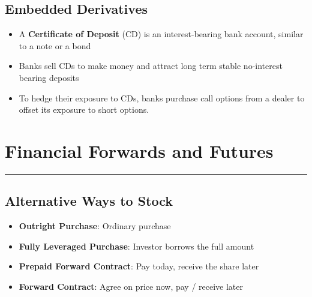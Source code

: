 \documentclass[11pt]{article}
\begin{document}
\subsection{Embedded Derivatives}
\begin{itemize}
\item A \textbf{Certificate of Deposit} (CD) is an interest-bearing bank account, similar to a note or a bond
\item Banks sell CDs to make money and attract long term stable no-interest bearing deposits
\item To hedge their exposure to CDs, banks purchase call options from a dealer to offset its exposure to short options.
\end{itemize}
\pagebreak


\section{Financial Forwards and Futures}
\hrule \vspace{15pt}
\subsection{Alternative Ways to Stock}
\begin{itemize}
\item \textbf{Outright Purchase}: Ordinary purchase
\item \textbf{Fully Leveraged Purchase}: Investor borrows the full amount
\item \textbf{Prepaid Forward Contract}: Pay today, receive the share later
\item \textbf{Forward Contract}: Agree on price now, pay / receive later
\end{itemize}
\end{document}
